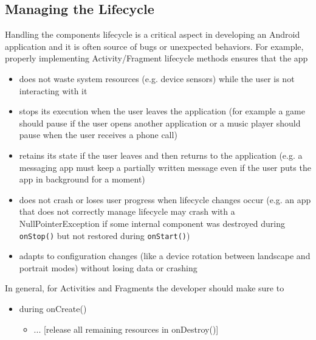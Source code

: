 \documentclass[11pt,a4paper,notitlepage]{article}
\begin{document}
\subsection{Managing the Lifecycle}\label{managing_lifecycle}
Handling the components lifecycle is a critical aspect in developing an Android application and it is often source of bugs or unexpected behaviors. For example, properly implementing Activity/Fragment lifecycle methods ensures that the app
\begin{itemize}
	\item does not waste system resources (e.g. device sensors) while the user is not interacting with it
	\item stops its execution when the user leaves the application (for example a game should pause if the user opens another application or a music player should pause when the user receives a phone call)
	\item retains its state if the user leaves and then returns to the application (e.g. a messaging app must keep a partially written message even if the user puts the app in background for a moment)
	\item does not crash or loses user progress when lifecycle changes occur (e.g. an app that does not correctly manage lifecycle may crash with a NullPointerException if some internal component was destroyed during \texttt{onStop()} but not restored during \texttt{onStart()})
	\item adapts to configuration changes (like a device rotation between landscape and portrait modes) without losing data or crashing
\end{itemize}
In general, for Activities and Fragments the developer should make sure to
\begin{itemize}
	\item during onCreate()
	\begin{itemize}
		\item ... [release all remaining resources in onDestroy()]
	\end{itemize}
\end{itemize}
\end{document}
